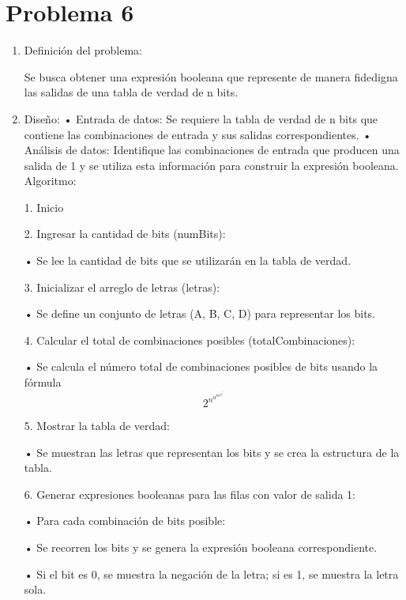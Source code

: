 \documentclass{IEEEcsmag}
\begin{document}
\section{Problema 6}

\begin{enumerate}


\item Definición del problema:\newline

Se busca obtener una expresión booleana que represente de manera fidedigna las salidas de una tabla de verdad de n bits.\newline\newline
 \item  Diseño:\newline
•	Entrada de datos:
Se requiere la tabla de verdad de n bits que contiene las combinaciones de entrada y sus salidas correspondientes.
•	Análisis de datos:
Identifique las combinaciones de entrada que producen una salida de 1 y se utiliza esta información para construir la expresión booleana.\newline
Algoritmo:

1.	Inicio

2.	Ingresar la cantidad de bits (numBits):

•	Se lee la cantidad de bits que se utilizarán en la tabla de verdad.

3.	Inicializar el arreglo de letras (letras):

•	Se define un conjunto de letras (A, B, C, D) para representar los bits.

4.	Calcular el total de combinaciones posibles (totalCombinaciones):

•	Se calcula el número total de combinaciones posibles de bits usando la fórmula 
\begin{equation}
    2^n^u^m^B^i^t^s
\end{equation}

5.	Mostrar la tabla de verdad:

•	Se muestran las letras que representan los bits y se crea la estructura de la tabla.

6.	Generar expresiones booleanas para las filas con valor de salida 1:

•	Para cada combinación de bits posible:

•	Se recorren los bits y se genera la expresión booleana correspondiente.

•	Si el bit es 0, se muestra la negación de la letra; si es 1, se muestra la letra sola.





\end{enumerate}
\end{document}
